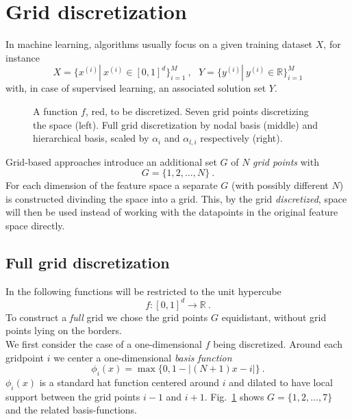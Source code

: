 \section{Grid discretization}\label{sec:grid}

In machine learning, algorithms usually focus on a given training dataset
$X$, for instance
$$ X = \{x^{(i)} | \ x^{(i)} \in [0, 1]^d\}_{i = 1}^M \ , \ \ \
Y = \{y^{(i)} | \ y^{(i)} \in \mathbb{R}\}_{i=1}^M$$
with, in case of supervised learning, an associated solution set $Y$.

\par

\begin{figure}[t!]
  \centering
  
  
  
  \caption{A function $f$, red, to be discretized.
    Seven grid points discretizing the space
    (left). Full grid discretization by nodal basis (middle) and
    hierarchical basis, scaled by $\alpha_i$ and $\alpha_{l,i}$
    respectively (right).\label{fig:fig1}}
\end{figure}

Grid-based approaches introduce an additional set $G$ of $N$
\emph{grid points} with
$$ G = \{1,2,\dots,N\} \ .$$
For each dimension of the feature space a separate $G$ (with possibly
different $N$) is constructed divinding the space into a grid.
This, by the grid \emph{discretized}, space
will then be used instead of working with the datapoints in the original
feature space directly.

\subsection{Full grid discretization}\label{subsec:fullgrid}
In the following functions
will be restricted to the unit hypercube
 $$ f: [0, 1]^d \rightarrow \mathbb{R} \ .$$
To construct a \emph{full} grid we chose the grid points $G$ equidistant,
without grid points lying on the borders. \\
We first consider the case of a one-dimensional $f$ being discretized.
Around each gridpoint $i$ we center a one-dimensional
\emph{basis function}
$$ \phi_i(x) = \max\{0, 1 - |(N + 1)x - i|\} \ .$$
$\phi_i(x)$ is a standard hat function centered around $i$ and dilated
to have local support between the grid points $i - 1$ and $i + 1$. Fig.~\ref{fig:fig1}
shows $G = \{1,2,\dots,7\}$ and the related basis-functions.

